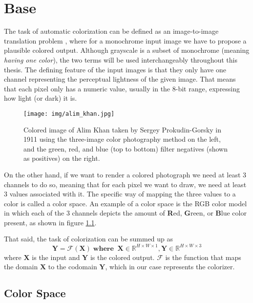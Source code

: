 \chapter{Base}
\label{ch:base}

The task of automatic colorization can be defined as an image-to-image 
translation problem \citep{pang2021imagetoimage}, where for a monochrome 
input image we have to propose a plausible colored output. Although 
grayscale is a subset of monochrome (meaning \textit{having one color}), 
the two terms will be used interchangeably throughout this thesis. 
The defining feature of the input images is that they only have one channel 
representing the perceptual lightness of the given image. That means that 
each pixel only has a numeric value, usually in the 8-bit range, 
expressing how light (or dark) it is. 

\begin{figure}[H]
    \centering
    \texttt{[image: img/alim\_khan.jpg]}
    \caption{
    Colored image of Alim Khan taken by Sergey Prokudin-Gorsky 
    in 1911 using the three-image color photography method on the left,
    and the green, red, and blue (top to bottom) filter negatives
    (shown as positives) on the right.}
    \label{fig:alim_khan}
\end{figure}

On the other hand, if we want to render a colored photograph we need at 
least 3 channels to do so, meaning that for each pixel we want to draw, 
we need at least 3 values associated with it. The specific way of mapping 
the three values to a color is called a color space. An example of a color
space is the RGB color model in which each of the 3 channels depicts the 
amount of \textbf{R}ed, \textbf{G}reen, or \textbf{B}lue color present,
as shown in figure \ref{fig:alim_khan}. 

That said, the task of colorization can be summed up as
\begin{equation}
    \mathbf{Y} = \mathcal{F}(\mathbf{X})\;\mathbf{where}\;\;\mathbf{X} \in \mathbb{R}^{H \times W \times 1}, \mathbf{Y} \in \mathbb{R}^{H \times W \times 3}\label{eq:colorization}
\end{equation}    
where $\mathbf{X}$ is the input 
and $\mathbf{Y}$ is the colored output.
$\mathcal{F}$ is the function that maps the domain $\mathbf{X}$ to the codomain 
$\mathbf{Y}$, which in our case represents the colorizer.

\section{Color Space}
\label{sec:colorspace}

